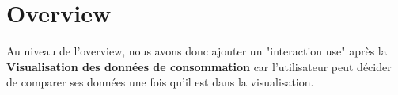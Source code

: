 \section{Overview}

\begin{flushleft}
Au niveau de l'overview, nous avons donc ajouter un "interaction use" après la \textbf{Visualisation des données de consommation} car l'utilisateur peut décider de comparer ses données une fois qu'il est dans la visualisation.
\end{flushleft}


